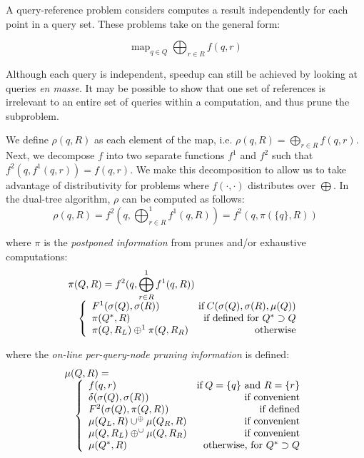 \documentclass[times, 10pt,twocolumn]{article}
\newcommand{\union}{\cup}
\DeclareMathOperator*{\map}{map}
\DeclareMathOperator{\IF}{if}
\newcommand{\muv}{\union^{\oplus}}
\newcommand{\muh}{\oplus^{\union}}
\begin{document}

A query-reference problem considers computes a result independently for each point in a query set.
These problems take on the general form:
 
  $$\map_{q \in Q} \bigoplus_{r \in R} f(q, r)$$

Although each query is independent, speedup can still be achieved by looking at queries {\it en masse}.
It may be possible to show that one set of references is irrelevant to an entire set of queries within a computation, and thus prune the subproblem.

We define $\rho(q, R)$ as each element of the map, i.e. $\rho(q, R) = \bigoplus_{r \in R} f(q, r)$.
Next, we decompose $f$ into two separate functions $f^1$ and $f^2$ such that $f^2(q, f^1(q, r)) = f(q, r)$.
We make this decomposition to allow us to take advantage of distributivity for problems where $f(\cdot, \cdot)$ distributes over $\bigoplus$.
In the dual-tree algorithm, $\rho$ can be computed as follows:
\begin{equation}
  \label{eqn:rho}
  \rho(q, R) = f^{2}(q, \bigoplus^{1}_{r \in R} f^{1}(q, R)) = f^{2}(q, \pi(\{q\}, R))
  \end{equation}
  
\noindent where $\pi$ is the {\it postponed information} from prunes and/or exhaustive computations:
\begin{equation}
\label{eqn:pi}
 \begin{array}{ll}
  \lefteqn{\pi(Q, R) = f^{2}(q, \bigoplus^{1}_{r \in R} f^{1}(q, R))}
  \\
  & \left\{
    \begin{array}{lr}
      F^{1}(\sigma(Q), \sigma(R)) & \IF C(\sigma(Q), \sigma(R), \mu(Q))
      \\
      \pi(Q^{*}, R) & \mbox{if defined for } Q^{*} \supset Q
      \\
      \pi(Q, R_L) \oplus^{1} \pi(Q, R_R) & \mbox{otherwise}
    \end{array}
  \right.
 \end{array}
\end{equation}

\noindent where the {\it on-line per-query-node pruning information} is defined:
\begin{equation}
\label{eqn:mu}
 \begin{array}{ll}
  \lefteqn{\mu(Q, R) =}
  \\
  & \left\{
    \begin{array}{lr}
      f(q, r) & \IF Q = \{q\} \mbox{ and } R = \{r\}
      \\
      \delta(\sigma(Q), \sigma(R)) & \mbox{if convenient}
      \\
      F^2(\sigma(Q), \pi(Q, R)) & \mbox{if defined}
      \\
      \mu(Q_L, R) \muv \mu(Q_R, R) & \mbox{if convenient}
      \\
      \mu(Q, R_L) \muh \mu(Q, R_R) & \mbox{if convenient}
      \\
      \mu(Q^{*}, R) & \mbox{otherwise, for } Q^{*} \supset Q
    \end{array}
  \right.
 \end{array}
\end{equation}
\end{document}
